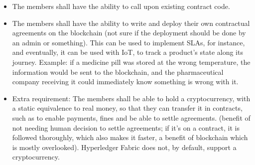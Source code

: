 \begin{itemize}
\begin{itemize}
            \begin{itemize}
			\item The members shall have the ability to call upon existing contract code.
			\item The members shall have the ability to write  and deploy their own contractual agreements on the blockchain (not sure if the deployment should be done by an admin or something). This can be used to implement SLAs, for instance, and eventually, it can be used with IoT, to track a product's state along its journey. Example: if a medicine pill was stored at the wrong temperature, the information would be sent to the blockchain, and the pharmaceutical company receiving it could immediately know something is wrong with it.
			
            \item Extra requirement: The members shall be able to hold a cryptocurrency, with a static equivalence to real money, so that they can transfer it in contracts, such as to enable payments, fines and be able to settle agreements. (benefit of not needing human decision to settle agreements; if it's on a contract, it is followed thoroughly, which also makes it faster, a benefit of blockchain which is mostly overlooked). Hyperledger Fabric does not, by default, support a cryptocurrency.
            \end{itemize}
    \end{itemize}
\end{itemize}

